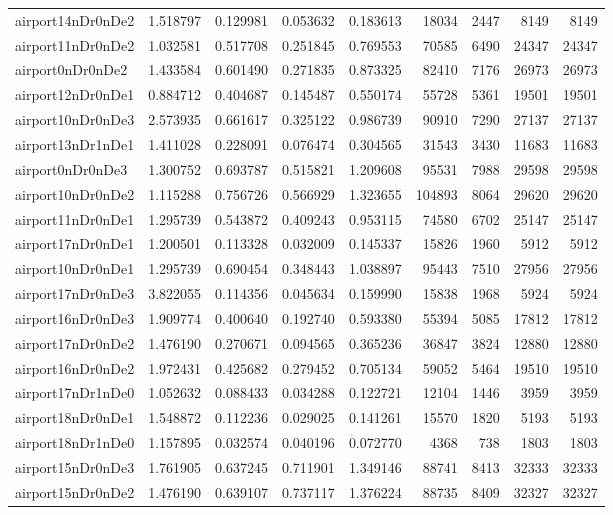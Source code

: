 \begin{longtable}{|l|r|r|r|r|r|r|r|r|}
airport14nDr0nDe2 & 1.518797 & 0.129981 & 0.053632 & 0.183613 & 18034 & 2447 & 8149 & 8149 \\
airport11nDr0nDe2 & 1.032581 & 0.517708 & 0.251845 & 0.769553 & 70585 & 6490 & 24347 & 24347 \\
airport0nDr0nDe2 & 1.433584 & 0.601490 & 0.271835 & 0.873325 & 82410 & 7176 & 26973 & 26973 \\
airport12nDr0nDe1 & 0.884712 & 0.404687 & 0.145487 & 0.550174 & 55728 & 5361 & 19501 & 19501 \\
airport10nDr0nDe3 & 2.573935 & 0.661617 & 0.325122 & 0.986739 & 90910 & 7290 & 27137 & 27137 \\
airport13nDr1nDe1 & 1.411028 & 0.228091 & 0.076474 & 0.304565 & 31543 & 3430 & 11683 & 11683 \\
airport0nDr0nDe3 & 1.300752 & 0.693787 & 0.515821 & 1.209608 & 95531 & 7988 & 29598 & 29598 \\
airport10nDr0nDe2 & 1.115288 & 0.756726 & 0.566929 & 1.323655 & 104893 & 8064 & 29620 & 29620 \\
airport11nDr0nDe1 & 1.295739 & 0.543872 & 0.409243 & 0.953115 & 74580 & 6702 & 25147 & 25147 \\
airport17nDr0nDe1 & 1.200501 & 0.113328 & 0.032009 & 0.145337 & 15826 & 1960 & 5912 & 5912 \\
airport10nDr0nDe1 & 1.295739 & 0.690454 & 0.348443 & 1.038897 & 95443 & 7510 & 27956 & 27956 \\
airport17nDr0nDe3 & 3.822055 & 0.114356 & 0.045634 & 0.159990 & 15838 & 1968 & 5924 & 5924 \\
airport16nDr0nDe3 & 1.909774 & 0.400640 & 0.192740 & 0.593380 & 55394 & 5085 & 17812 & 17812 \\
airport17nDr0nDe2 & 1.476190 & 0.270671 & 0.094565 & 0.365236 & 36847 & 3824 & 12880 & 12880 \\
airport16nDr0nDe2 & 1.972431 & 0.425682 & 0.279452 & 0.705134 & 59052 & 5464 & 19510 & 19510 \\
airport17nDr1nDe0 & 1.052632 & 0.088433 & 0.034288 & 0.122721 & 12104 & 1446 & 3959 & 3959 \\
airport18nDr0nDe1 & 1.548872 & 0.112236 & 0.029025 & 0.141261 & 15570 & 1820 & 5193 & 5193 \\
airport18nDr1nDe0 & 1.157895 & 0.032574 & 0.040196 & 0.072770 & 4368 & 738 & 1803 & 1803 \\
airport15nDr0nDe3 & 1.761905 & 0.637245 & 0.711901 & 1.349146 & 88741 & 8413 & 32333 & 32333 \\
airport15nDr0nDe2 & 1.476190 & 0.639107 & 0.737117 & 1.376224 & 88735 & 8409 & 32327 & 32327 \\

\end{longtable}
